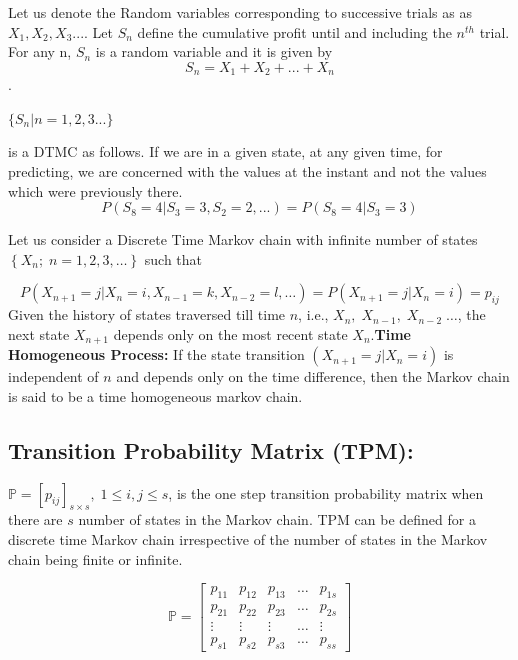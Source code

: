 Let us  denote the  Random variables corresponding to successive trials as as ${X_1, X_2, X_3 ...}$.
Let $S_n$ define the cumulative profit until and including the $n^{th}$ trial.  For any n,  $S_n$ is a random variable and it is given by 
\begin{equation}
    S_n = X_1 + X_2 + ... +X_n
\end{equation}.
\begin{center}
$\{S_n|n=1,2,3...\}$ 
\end{center}
is a DTMC as follows. If we are in a given state, at any given time, for predicting, we are concerned with the values at the instant and not the values which were previously there.
\begin{equation*}
    P(S_8=4|S_3=3,S_2=2,...)=P(S_8=4|S_3=3)
\end{equation*}

Let us consider a Discrete Time Markov chain with infinite number of states $\left\{X_n;\;n=1,2,3,\dots\right\}$ such that

\begin{equation*}
    P(X_{n+1}=j|X_n=i,X_{n-1}=k,X_{n-2}=l,\dots)=P(X_{n+1}=j|X_n=i)=p_{ij}
\end{equation*}
Given the history of states traversed till time $n$, i.e., $X_n,\;X_{n-1},\;X_{n-2}\;\dots$, the next state $X_{n+1}$ depends only on the most recent state $X_n$.\textbf{Time Homogeneous Process:} If the state transition $(X_{n+1}=j|X_n=i)$ is independent of $n$ and depends only on the time difference, then the Markov chain is said to be a time homogeneous markov chain.
\subsection{Transition Probability Matrix (TPM): } $\mathbb{P}=[p_{ij}]_{s\times s}, \; 1\leq i,j \leq s$, is the one step transition probability matrix when there are $s$ number of states in the Markov chain. TPM can be defined for a discrete time Markov chain irrespective of the number of states in the Markov chain being finite or infinite.
  
  \begin{equation*}
      \mathbb{P}=\begin{bmatrix}
      p_{11}&p_{12}&p_{13}&\dots & p_{1s}\\
      p_{21}&p_{22}&p_{23}&\dots & p_{2s}\\
      \vdots&\vdots&\vdots&\dots&\vdots\\
      p_{s1}&p_{s2}&p_{s3}&\dots&p_{ss}
      \end{bmatrix}
  \end{equation*}

